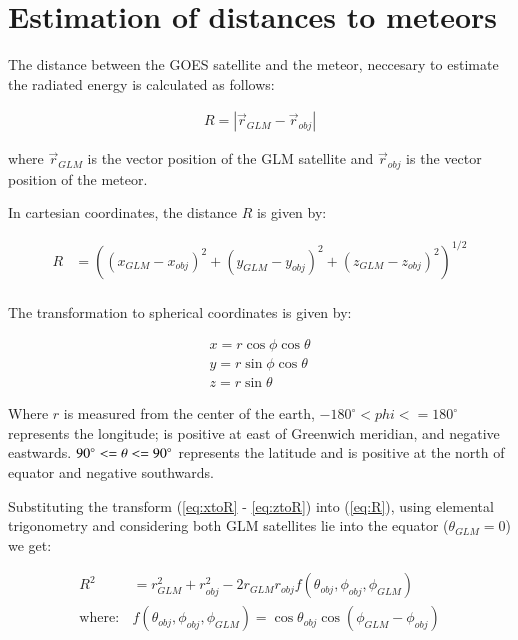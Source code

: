 \appendix


\section{Estimation of distances to meteors}

The distance between the GOES satellite and the meteor, neccesary to estimate the radiated energy is calculated as follows:

\begin{align}
  R = \left|\vec{r}_{GLM} - \vec{r}_{obj} \right|
\end{align}

where $\vec{r}_{GLM}$ is the vector position of the GLM satellite and $\vec{r}_{obj}$ is the vector position of the meteor.

In cartesian coordinates, the distance $R$ is given by:

\begin{align}
  R &= \left((x_{GLM}-x_{obj})^2 + (y_{GLM}-y_{obj})^2 + (z_{GLM}-z_{obj})^2\right)^{1/2} \label{eq:R}\\
\end{align}

The transformation to spherical coordinates is given by:

\begin{align}
  x = r\cos\phi\cos\theta \label{eq:xtoR}\\
  y = r\sin\phi\cos\theta \label{eq:ytoR}\\
  z = r\sin\theta \label{eq:ztoR}
\end{align}

Where $r$ is measured from the center of the earth, $ -180^\circ < phi <= 180^\circ$ represents the longitude; is positive at east of Greenwich meridian, and negative eastwards. $\-90^\circ <= \theta <= 90^\circ$ represents the latitude and is positive at the north of equator and negative southwards.

Substituting the transform (\ref{eq:xtoR} - \ref{eq:ztoR}) into (\ref{eq:R}), using elemental trigonometry and considering both GLM satellites lie into the equator ($\theta_{GLM}=0$) we get:

\begin{align}
  R^2 &= r_{GLM}^2 + r_{obj}^2 - 2r_{GLM}r_{obj}f(\theta_{obj}, \phi_{obj}, \phi_{GLM}) \label{eq:R2}\\
  \mathrm{where:} & f(\theta_{obj}, \phi_{obj}, \phi_{GLM}) = \cos\theta_{obj}\cos\left(\phi_{GLM}-\phi_{obj}\right)
\end{align}

